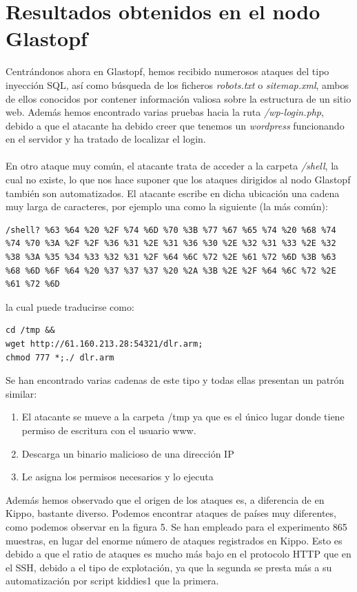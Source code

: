 \documentclass[journal]{IEEEtran}
\begin{document}
\section{Resultados obtenidos en el nodo Glastopf}
Centrándonos ahora en Glastopf, hemos recibido numerosos ataques del tipo inyección SQL, así como búsqueda de los ficheros \textit{robots.txt} o \textit{sitemap.xml}, ambos de ellos conocidos por contener información valiosa sobre la estructura de un sitio web. Además hemos encontrado varias pruebas hacia la ruta \textit{/wp-login.php}, debido a que el atacante ha debido creer que tenemos un \textit{wordpress} funcionando en el servidor y ha tratado de localizar el login.
\\\\
En otro ataque muy común, el atacante trata de acceder a la carpeta \textit{/shell}, la cual no existe, lo que nos hace suponer que los ataques dirigidos al nodo Glastopf también son automatizados. El atacante escribe en dicha ubicación una cadena muy larga de caracteres, por ejemplo una como la siguiente (la más común):
\begin{lstlisting}
/shell? %63 %64 %20 %2F %74 %6D %70 %3B %77 %67 %65 %74 %20 %68 %74 %74 %70 %3A %2F %2F %36 %31 %2E %31 %36 %30 %2E %32 %31 %33 %2E %32 %38 %3A %35 %34 %33 %32 %31 %2F %64 %6C %72 %2E %61 %72 %6D %3B %63 %68 %6D %6F %64 %20 %37 %37 %37 %20 %2A %3B %2E %2F %64 %6C %72 %2E %61 %72 %6D
\end{lstlisting}
la cual puede traducirse como:
\lstset{breaklines=true}
\begin{lstlisting}
cd /tmp &&
wget http://61.160.213.28:54321/dlr.arm;
chmod 777 *;./ dlr.arm
\end{lstlisting}
Se han encontrado varias cadenas de este tipo y todas ellas presentan un patrón similar:
\begin{enumerate}
\item El atacante se mueve a la carpeta /tmp ya que es el único lugar donde tiene permiso de escritura con el usuario www.
\item Descarga un binario malicioso de una dirección IP
\item Le asigna los permisos necesarios y lo ejecuta
\end{enumerate}
Además hemos observado que el origen de los ataques es, a diferencia de en Kippo, bastante diverso. Podemos encontrar ataques de países muy diferentes, como podemos observar en la figura 5. Se han empleado para el experimento 865 muestras, en lugar del enorme número de ataques registrados en Kippo. Esto es debido a que el ratio de ataques es mucho más bajo en el protocolo HTTP que en el SSH, debido a el tipo de explotación, ya que la segunda se presta más a su automatización por script kiddies1 que la primera.
\end{document}
